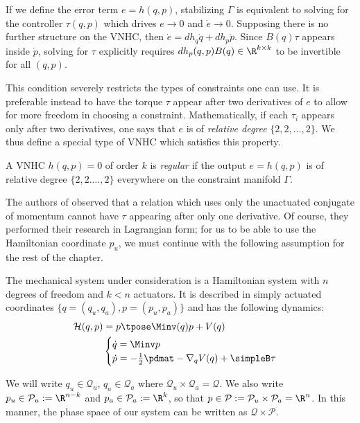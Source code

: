 If we define the error term  \(e = h(q,p)\), stabilizing \(\Gamma\) is
equivalent to solving for the controller \(\tau(q,p)\) which drives 
\(e \rightarrow 0\) and \(\dot{e} \rightarrow 0\).
Supposing there is no further structure on the VNHC, 
then \(\dot{e} = dh_q \dot{q} + dh_p \dot{p}\). Since \(B(q) \tau\) appears inside
\(\dot{p}\), solving for \(\tau\) explicitly requires 
\(dh_p(q,p)B(q) \in \R^{k \times k}\) to be invertible for all \((q,p)\).

This condition severely restricts the types of constraints one can use. 
It is preferable instead to have the torque \(\tau\) appear after two
derivatives of \(e\) to allow for more freedom in choosing a constraint.
Mathematically, if each \(\tau_i\) appears only after two derivatives, one says 
that \(e\) is of \textit{relative degree} \(\{2,2,\ldots,2\}\). 
We thus define a special type of VNHC which satisfies this
property.

\begin{defn}
    A VNHC \(h(q,p) = 0\) of order \(k\) is \textit{regular} if the output 
    \(e = h(q,p)\) is of relative degree \(\{2,2.\ldots,2\}\) everywhere on the
    constraint manifold \(\Gamma\).
\end{defn}

The authors of
\cite{nhvc_dynamic_walking,hybrid_zero_dynamics_bipedal_nhvcs,nhvc_incline_walking}
observed that a relation which uses only the unactuated conjugate of momentum
cannot have \(\tau\) appearing after only one derivative. Of course,
they performed their research in Lagrangian form; 
for us to be able to use the Hamiltonian coordinate \(p_u\), 
we must continue with the following assumption for the rest of the chapter.

\begin{assm}\label{assm:H-is-simply-actuated}
    The mechanical system under consideration is a
    Hamiltonian system with \(n\) degrees of freedom and 
    \(k < n\) actuators. It is described in simply
    actuated coordinates \(\{q = (q_u,q_a), p = (p_u, p_a)\}\) and has the
    following dynamics:
    \begin{align*}
        \mathcal{H}(q,p) &= p\tpose \Minv(q) p + V(q) \\
         &\begin{cases}
            \dot{q} = \Minv p \\
            \dot{p} = -\frac{1}{2} \pdmat - \nabla_q V(q) + \simpleB \tau \\
        \end{cases}
    \end{align*}
\end{assm}
\begin{notation}
    We will write \(q_u \in \mathcal{Q}_u\), \(q_a \in \mathcal{Q}_a\) where
    \(\mathcal{Q}_u \times \mathcal{Q}_a = \mathcal{Q}\). 
    We also write
    \(p_u \in \mathcal{P}_u := \R^{n-k}\) and 
    \(p_a \in \mathcal{P}_a := \R^k\), so that 
    \(p \in \mathcal{P} := \mathcal{P}_u \times \mathcal{P}_a = \R^n\). 
    In this manner, the phase space of our system can be written as
    \(\mathcal{Q} \times \mathcal{P}\).
\end{notation}

